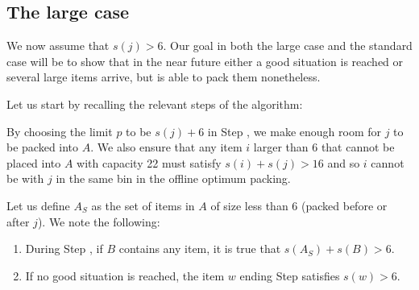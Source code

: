 \subsection{The large case}
We now assume that $s(j) > 6$. Our goal in both the large case and the
standard case will be to show that in the near future either a good
situation is reached or several large items arrive, but \tbalg is able
to pack them nonetheless.

Let us start by recalling the relevant steps of the algorithm:

\smallskip
{}

By choosing the limit $p$ to be $s(j)+6$ in Step , we make
enough room for $j$ to be packed into $A$. We also ensure that
any item $i$ larger than $6$ that cannot be placed into $A$ with
capacity 22 must satisfy $s(i) + s(j) > 16$ and so $i$ cannot be with
$j$ in the same bin in the offline optimum packing.

Let us define $A_S$ as the set of items in $A$ of size less than $6$
(packed before or after $j$).  We note the following:

\begin{obs}\label{obs:nothingonc}

\leavevmode
\begin{enumerate}
\item During Step {\rm {}}, if $B$ contains any item, it is true that
$s(A_S) + s(B) > 6$.
\item If no good situation is reached, the item $w$ ending Step {\rm {}} satisfies $s(w) > 6$.
\end{enumerate}

\end{obs}

